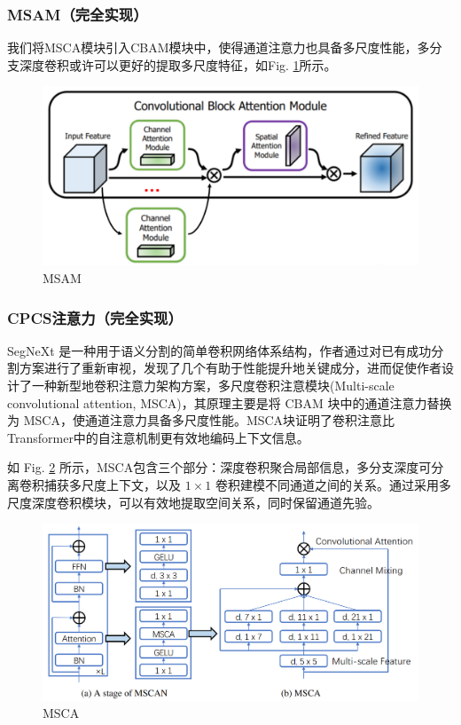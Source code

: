 \documentclass[a4paper]{ctexart}
\begin{document}
		\subsubsection*{MSAM（完全实现）}
		
		我们将MSCA模块引入CBAM模块中，使得通道注意力也具备多尺度性能，多分支深度卷积或许可以更好的提取多尺度特征，如Fig. \ref{fig: MSAM}所示。
		
		\begin{figure}[htbp]
			\centering
			\includegraphics[width=0.8\linewidth]{picture/LLIE/Experiment/MSAM}
			\caption{MSAM}
			\label{fig: MSAM}
		\end{figure}
		
		\subsubsection*{CPCS注意力（完全实现）}
		
		SegNeXt 是一种用于语义分割的简单卷积网络体系结构\cite{guo2022segnext}，作者通过对已有成功分割方案进行了重新审视，发现了几个有助于性能提升地关键成分，进而促使作者设计了一种新型地卷积注意力架构方案，多尺度卷积注意模块(Multi-scale convolutional attention, MSCA)，其原理主要是将 CBAM 块中的通道注意力替换为 MSCA，使通道注意力具备多尺度性能。MSCA块证明了卷积注意比Transformer中的自注意机制更有效地编码上下文信息。
		
		如 Fig. \ref{fig: MSCA} 所示，MSCA包含三个部分：深度卷积聚合局部信息，多分支深度可分离卷积捕获多尺度上下文，以及 $1 \times 1$ 卷积建模不同通道之间的关系。通过采用多尺度深度卷积模块，可以有效地提取空间关系，同时保留通道先验\cite{huang2023channel}。
		
		\begin{figure}[htbp]
			\centering
			\includegraphics[width=0.8\linewidth]{picture/LLIE/Experiment/MSCA}
			\caption{MSCA}
			\label{fig: MSCA}
		\end{figure}
			
\end{document}
